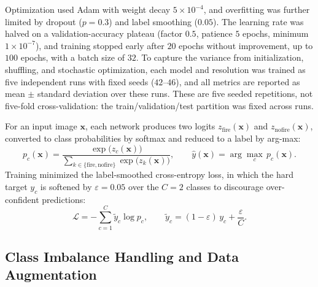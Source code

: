 \documentclass[conference]{IEEEtran}
\begin{document}
Optimization used Adam with weight decay $5\times10^{-4}$, and overfitting was further limited by dropout ($p=0.3$) and label smoothing ($0.05$). The learning rate was halved on a validation-accuracy plateau (factor $0.5$, patience $5$ epochs, minimum $1\times10^{-7}$), and training stopped early after $20$ epochs without improvement, up to $100$ epochs, with a batch size of $32$. To capture the variance from initialization, shuffling, and stochastic optimization, each model and resolution was trained as five independent runs with fixed seeds ($42$--$46$), and all metrics are reported as mean $\pm$ standard deviation over these runs. These are five seeded repetitions, not five-fold cross-validation: the train/validation/test partition was fixed across runs.

For an input image $\mathbf{x}$, each network produces two logits $z_{\text{fire}}(\mathbf{x})$ and $z_{\text{nofire}}(\mathbf{x})$, converted to class probabilities by softmax and reduced to a label by arg-max:
\begin{equation}
p_c(\mathbf{x}) = \frac{\exp\!\big(z_c(\mathbf{x})\big)}{\displaystyle\sum_{k\in\{\text{fire},\text{nofire}\}}\!\exp\!\big(z_k(\mathbf{x})\big)},
\qquad
\hat{y}(\mathbf{x}) = \arg\max_{c}\, p_c(\mathbf{x}).
\label{eq:softmax}
\end{equation}
Training minimized the label-smoothed cross-entropy loss, in which the hard target $y_c$ is softened by $\varepsilon = 0.05$ over the $C = 2$ classes to discourage over-confident predictions:
\begin{equation}
\mathcal{L} = -\sum_{c=1}^{C} \tilde{y}_c \log p_c,
\qquad
\tilde{y}_c = (1-\varepsilon)\,y_c + \frac{\varepsilon}{C}.
\label{eq:loss}
\end{equation}

\subsection{Class Imbalance Handling and Data Augmentation}
\end{document}
